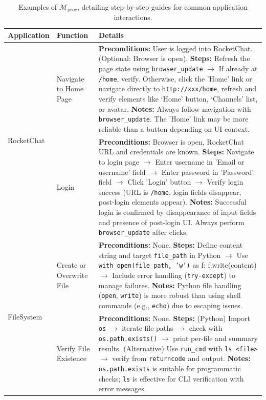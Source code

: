 \renewcommand{\arraystretch}{1.3}
\begin{table}[htbp]
\centering
\small
\caption{Examples of $\mathcal{M}_{proc}$, detailing step-by-step guides for common application interactions.}
\vspace{5pt}
\label{tab:procedural_memory}
\begin{tabular}{l|p{2cm}|p{8cm}}
\toprule
\textbf{Application} & \textbf{Function} & \textbf{Details} \\
\midrule

\multirow{2}{*}{RocketChat} 
& Navigate to Home Page & 
\textbf{Preconditions:} User is logged into RocketChat. (Optional: Browser is open).  
\textbf{Steps:} Refresh the page state using \texttt{browser\_update} $\rightarrow$ If already at \texttt{/home}, verify. Otherwise, click the 'Home' link or navigate directly to \texttt{http://xxx/home}, refresh and verify elements like `Home' button, `Channels' list, or avatar.  
\textbf{Notes:} Always follow navigation with \texttt{browser\_update}. The 'Home' link may be more reliable than a button depending on UI context. \\

& Login & 
\textbf{Preconditions:} Browser is open, RocketChat URL and credentials are known.  
\textbf{Steps:} Navigate to login page $\rightarrow$ Enter username in 'Email or username' field $\rightarrow$ Enter password in 'Password' field $\rightarrow$ Click 'Login' button $\rightarrow$ Verify login success (URL is \texttt{/home}, login fields disappear, post-login elements appear).  
\textbf{Notes:} Successful login is confirmed by disappearance of input fields and presence of post-login UI. Always perform \texttt{browser\_update} after clicks. \\
\midrule

\multirow{2}{*}{FileSystem} 
& Create or Overwrite File & 
\textbf{Preconditions:} None.  
\textbf{Steps:} Define content string and target \texttt{file\_path} in Python $\rightarrow$ Use \texttt{with open(file\_path, 'w')} as f: f.write(content) $\rightarrow$ Include error handling (\texttt{try-except}) to manage failures.  
\textbf{Notes:} Python file handling (\texttt{open}, \texttt{write}) is more robust than using shell commands (e.g., \texttt{echo}) due to escaping issues. \\

& Verify File Existence & 
\textbf{Preconditions:} None.  
\textbf{Steps:} (Python) Import \texttt{os} $\rightarrow$ iterate file paths $\rightarrow$ check with \texttt{os.path.exists()} $\rightarrow$ print per-file and summary results.  
(Alternative) Use \texttt{run\_cmd} with \texttt{ls <file>} $\rightarrow$ verify from \texttt{returncode} and output.  
\textbf{Notes:} \texttt{os.path.exists} is suitable for programmatic checks; \texttt{ls} is effective for CLI verification with error messages. \\
\midrule


\end{tabular}
\end{table}
